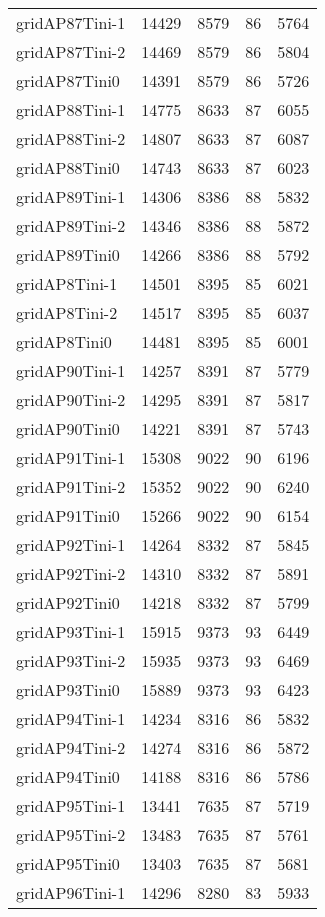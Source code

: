 \begin{longtable}{lrrrr}
gridAP87Tini-1 & 14429 & 8579 & 86 & 5764 \\
gridAP87Tini-2 & 14469 & 8579 & 86 & 5804 \\
gridAP87Tini0 & 14391 & 8579 & 86 & 5726 \\
gridAP88Tini-1 & 14775 & 8633 & 87 & 6055 \\
gridAP88Tini-2 & 14807 & 8633 & 87 & 6087 \\
gridAP88Tini0 & 14743 & 8633 & 87 & 6023 \\
gridAP89Tini-1 & 14306 & 8386 & 88 & 5832 \\
gridAP89Tini-2 & 14346 & 8386 & 88 & 5872 \\
gridAP89Tini0 & 14266 & 8386 & 88 & 5792 \\
gridAP8Tini-1 & 14501 & 8395 & 85 & 6021 \\
gridAP8Tini-2 & 14517 & 8395 & 85 & 6037 \\
gridAP8Tini0 & 14481 & 8395 & 85 & 6001 \\
gridAP90Tini-1 & 14257 & 8391 & 87 & 5779 \\
gridAP90Tini-2 & 14295 & 8391 & 87 & 5817 \\
gridAP90Tini0 & 14221 & 8391 & 87 & 5743 \\
gridAP91Tini-1 & 15308 & 9022 & 90 & 6196 \\
gridAP91Tini-2 & 15352 & 9022 & 90 & 6240 \\
gridAP91Tini0 & 15266 & 9022 & 90 & 6154 \\
gridAP92Tini-1 & 14264 & 8332 & 87 & 5845 \\
gridAP92Tini-2 & 14310 & 8332 & 87 & 5891 \\
gridAP92Tini0 & 14218 & 8332 & 87 & 5799 \\
gridAP93Tini-1 & 15915 & 9373 & 93 & 6449 \\
gridAP93Tini-2 & 15935 & 9373 & 93 & 6469 \\
gridAP93Tini0 & 15889 & 9373 & 93 & 6423 \\
gridAP94Tini-1 & 14234 & 8316 & 86 & 5832 \\
gridAP94Tini-2 & 14274 & 8316 & 86 & 5872 \\
gridAP94Tini0 & 14188 & 8316 & 86 & 5786 \\
gridAP95Tini-1 & 13441 & 7635 & 87 & 5719 \\
gridAP95Tini-2 & 13483 & 7635 & 87 & 5761 \\
gridAP95Tini0 & 13403 & 7635 & 87 & 5681 \\
gridAP96Tini-1 & 14296 & 8280 & 83 & 5933 \\

\end{longtable}
